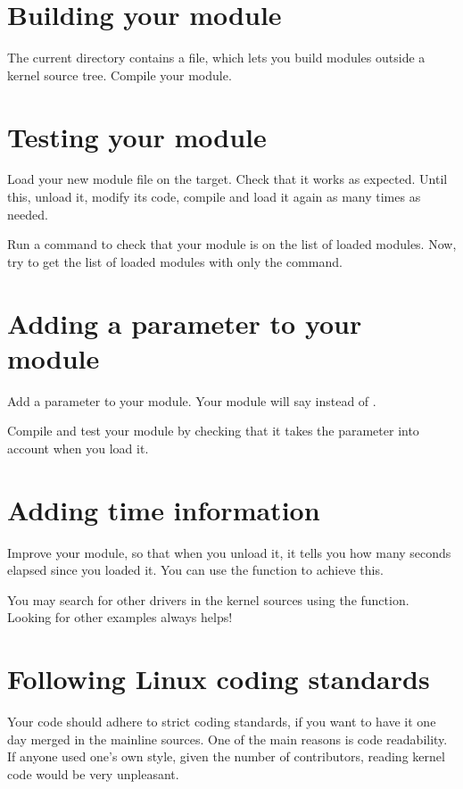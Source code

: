 \section{Building your module}

The current directory contains a  file, which lets you
build modules outside a kernel source tree.  Compile your module.

\section{Testing your module}

Load your new module file on the target. Check that it works as
expected. Until this, unload it, modify its code, compile and load it
again as many times as needed.

Run a command to check that your module is on the list of loaded
modules. Now, try to get the list of loaded modules with only the
 command.

\section{Adding a parameter to your module}

Add a  parameter to your module. Your module will say
 instead of .

Compile and test your module by checking that it takes the 
parameter into account when you load it.

\section{Adding time information}

Improve your module, so that when you unload it, it tells you how many
seconds elapsed since you loaded it.  You can use the
 function to achieve this.

You may search for other drivers in the kernel sources using the
 function. Looking for other examples always helps!

\section{Following Linux coding standards}

Your code should adhere to strict coding standards, if you want to
have it one day merged in the mainline sources. One of the main
reasons is code readability. If anyone used one's own style, given the
number of contributors, reading kernel code would be very unpleasant.

